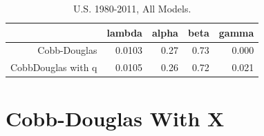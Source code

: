 \documentclass[preprint,authoryear,12pt]{elsarticle}\usepackage{graphicx, color}
\begin{document}
\begin{table}[ht]
\begin{center}
\caption{U.S. 1980-2011, All Models.}
\begin{tabular}{rrrrr}
  \hline
 & lambda & alpha & beta & gamma \\ 
  \hline
Cobb-Douglas & 0.0103 & 0.27 & 0.73 & 0.000 \\ 
  CobbDouglas with q & 0.0105 & 0.26 & 0.72 & 0.021 \\ 
   \hline
\end{tabular}
\end{center}
\end{table}






\section{Cobb-Douglas With X}
\end{document}

